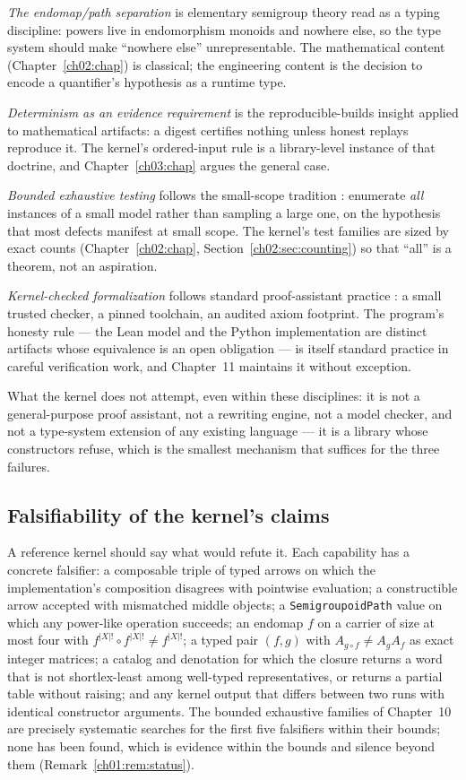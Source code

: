 \emph{The endomap/path separation} is elementary semigroup theory
\cite{howie, pin} read as a typing discipline: powers live in
endomorphism monoids and nowhere else, so the type system should make
``nowhere else'' unrepresentable. The mathematical content
(Chapter~\ref{ch02:chap}) is classical; the engineering content is the
decision to encode a quantifier's hypothesis as a runtime type.

\emph{Determinism as an evidence requirement} is the reproducible-builds
insight applied to mathematical artifacts: a digest certifies nothing
unless honest replays reproduce it. The kernel's ordered-input rule is a
library-level instance of that doctrine, and
Chapter~\ref{ch03:chap} argues the general case.

\emph{Bounded exhaustive testing} follows the small-scope tradition
\cite{jackson}: enumerate \emph{all} instances of a small model rather
than sampling a large one, on the hypothesis that most defects manifest
at small scope. The kernel's test families are sized by exact counts
(Chapter~\ref{ch02:chap}, Section~\ref{ch02:sec:counting}) so that
``all'' is a theorem, not an aspiration.

\emph{Kernel-checked formalization} follows standard proof-assistant
practice \cite{lean4}: a small trusted checker, a pinned toolchain, an
audited axiom footprint. The program's honesty rule --- the Lean model
and the Python implementation are distinct artifacts whose equivalence
is an open obligation --- is itself standard practice in careful
verification work, and Chapter~11 maintains it without exception.

What the kernel does not attempt, even within these disciplines: it is
not a general-purpose proof assistant, not a rewriting engine, not a
model checker, and not a type-system extension of any existing language
--- it is a library whose constructors refuse, which is the smallest
mechanism that suffices for the three failures.

\subsection{Falsifiability of the kernel's claims}

A reference kernel should say what would refute it. Each capability has
a concrete falsifier: a composable triple of typed arrows on which the
implementation's composition disagrees with pointwise evaluation; a
constructible arrow accepted with mismatched middle objects; a
\texttt{SemigroupoidPath} value on which any power-like operation
succeeds; an endomap $f$ on a carrier of size at most four with
$f^{|X|!} \circ f^{|X|!} \neq f^{|X|!}$; a typed pair $(f, g)$ with
$A_{g \circ f} \neq A_g A_f$ as exact integer matrices; a catalog and
denotation for which the closure returns a word that is not
shortlex-least among well-typed representatives, or returns a partial
table without raising; and any kernel output that differs between two
runs with identical constructor arguments. The bounded exhaustive
families of Chapter~10 are precisely systematic searches for the first
five falsifiers within their bounds; none has been found, which is
evidence within the bounds and silence beyond them
(Remark~\ref{ch01:rem:status}).

